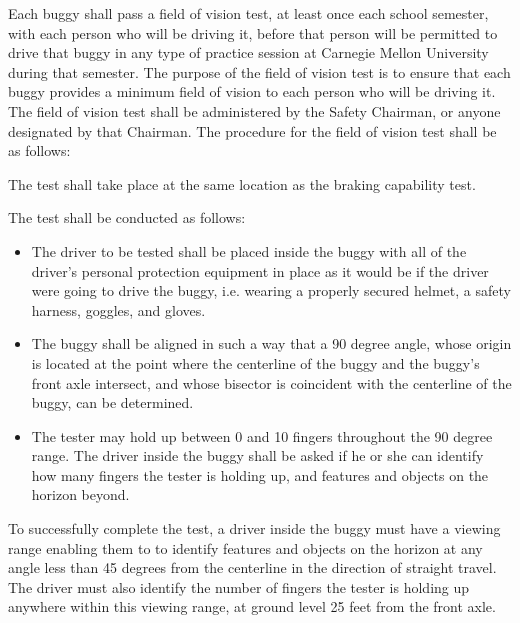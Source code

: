 	Each buggy shall pass a field of vision test, at least once each school
	semester, with each person who will be driving it, before that person will be
	permitted to drive that buggy in any type of practice session at Carnegie
	Mellon University during that semester. The purpose of the field of vision test
	is to ensure that each buggy provides a minimum field of vision to each person
	who will be driving it. The field of vision test shall be administered by the
	Safety Chairman, or anyone designated by that Chairman. The procedure for the
	field of vision test shall be as follows:
	\newline

	\noindent The test shall take place at the same location as the braking capability test.
	\newline

	\noindent The test shall be conducted as follows:

	\begin{itemize}

		\item
		The driver to be tested shall be placed inside the buggy with all of the
		driver's personal protection equipment in place as it would be if the driver
		were going to drive the buggy, i.e. wearing a properly secured helmet, a safety
		harness, goggles, and gloves.

		\item
		The buggy shall be aligned in such a way that a 90 degree angle, whose origin
		is located at the point where the centerline of the buggy and the buggy's front
		axle intersect, and whose bisector is coincident with the centerline of the
		buggy, can be determined.

		\item
		The tester may hold up between 0 and 10 fingers throughout the 90 degree range.
		The driver inside the buggy shall be asked if he or she can identify how many
		fingers the tester is holding up, and features and objects on the horizon beyond.

	\end{itemize}

	To successfully complete the test, a driver inside the buggy must have a
	viewing range enabling them to to identify features and objects on the horizon at
	any angle less than 45 degrees from the centerline in the direction of straight
	travel. The driver must also identify the number of fingers the tester is holding
	up anywhere within this viewing range, at ground level 25 feet from the front axle.

